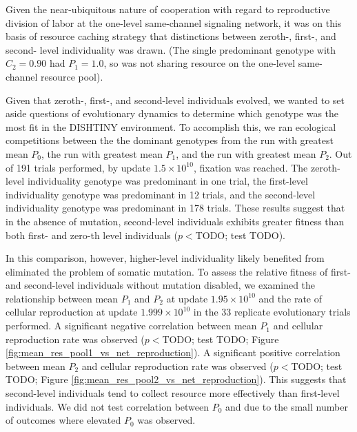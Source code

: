 Given the near-ubiquitous nature of cooperation with regard to reproductive division of labor at the one-level same-channel signaling network, it was on this basis of resource caching strategy that distinctions between zeroth-, first-, and second- level individuality was drawn.
(The single predominant genotype with $C_2 = 0.90$ had $P_1 = 1.0$, so was not sharing resource on the one-level same-channel resource pool).

Given that zeroth-, first-, and second-level individuals evolved, we wanted to set aside questions of evolutionary dynamics to determine which genotype was the most fit in the DISHTINY environment.
To accomplish this, we ran ecological competitions between the the dominant genotypes from the run with greatest mean $P_0$, the run with greatest mean $P_1$, and the run with greatest mean $P_2$.
Out of 191 trials performed, by update $1.5 \times 10^{10}$, fixation was reached.
The zeroth-level individuality genotype was predominant in one trial, the first-level individuality genotype was predominant in 12 trials, and the second-level individuality genotype was predominant in 178 trials.
These results suggest that in the absence of mutation, second-level individuals exhibits greater fitness than both first- and zero-th level individuals ($p < $TODO; test TODO).

In this comparison, however, higher-level individuality likely benefited from eliminated the problem of somatic mutation.
To assess the relative fitness of first- and second-level individuals without mutation disabled, we examined the relationship between mean $P_1$ and $P_2$ at update $1.95 \times 10^{10}$ and the rate of cellular reproduction at update $1.999 \times 10^{10}$ in the 33 replicate evolutionary trials performed.
A significant negative correlation between mean $P_1$ and cellular reproduction rate was observed ($p < $TODO; test TODO; Figure \ref{fig:mean_res_pool1_vs_net_reproduction}).
A significant positive correlation between mean $P_2$ and cellular reproduction rate was observed ($p < $TODO; test TODO; Figure \ref{fig:mean_res_pool2_vs_net_reproduction}).
This suggests that second-level individuals tend to collect resource more effectively than first-level individuals.
We did not test correlation between $P_0$ and due to the small number of outcomes where elevated $P_0$ was observed.

